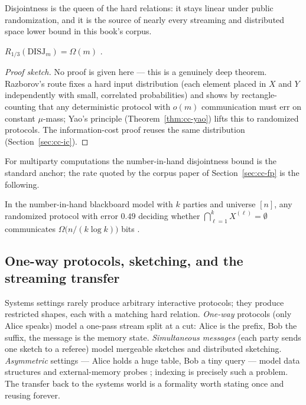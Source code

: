 Disjointness is the queen of the hard relations: it stays linear under public
randomization, and it is the source of nearly every streaming and distributed space
lower bound in this book's corpus.

\begin{theorem}\label{thm:cc-disj}
$R_{1/3}(\mathrm{DISJ}_m) = \Omega(m)$
\citep{communication-complexity-bg3,communication-complexity-bg4}. \eop
\end{theorem}

\begin{proof}[Proof sketch]
No proof is given here --- this is a genuinely deep theorem. Razborov's route
\citep{communication-complexity-bg4} fixes a hard input distribution (each element
placed in $X$ and $Y$ independently with small, correlated probabilities) and shows by
rectangle-counting that any deterministic protocol with $o(m)$ communication must err
on constant $\mu$-mass; Yao's principle (Theorem~\ref{thm:cc-yao}) lifts this to
randomized protocols. The information-cost proof reuses the same distribution
(Section~\ref{sec:cc-ic}).
\end{proof}

For multiparty computations the number-in-hand disjointness bound is the standard
anchor; the rate quoted by the corpus paper of Section~\ref{sec:cc-fp} is the
following.

\begin{proposition}\label{pro:cc-mpdisj}
In the number-in-hand blackboard model with $k$ parties and universe $[n]$, any
randomized protocol with error $0.49$ deciding whether
$\bigcap_{\ell=1}^k X^{(\ell)} = \emptyset$ communicates
$\Omega\bigl(n/(k\log k)\bigr)$ bits
\citep{communication-complexity-bg9}. \eop
\end{proposition}

\subsection{One-way protocols, sketching, and the streaming transfer}
\label{sec:cc-oneway}

Systems settings rarely produce arbitrary interactive protocols; they produce
restricted shapes, each with a matching hard relation. \emph{One-way} protocols (only
Alice speaks) model a one-pass stream split at a cut: Alice is the prefix, Bob the
suffix, the message is the memory state. \emph{Simultaneous messages} (each party sends
one sketch to a referee) model mergeable sketches and distributed sketching.
\emph{Asymmetric} settings --- Alice holds a huge table, Bob a tiny query --- model data
structures and external-memory probes \citep{communication-complexity-bg8}; indexing is
precisely such a problem. The transfer back to the systems world is a formality worth
stating once and reusing forever.

